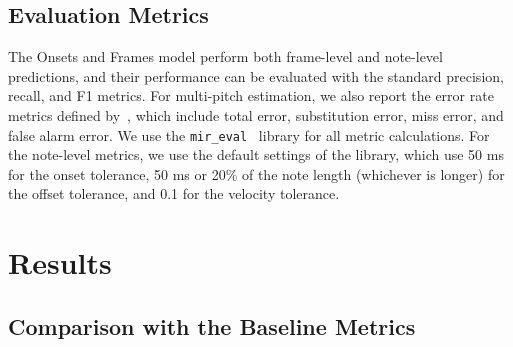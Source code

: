 \subsection{Evaluation Metrics}

The Onsets and Frames model perform both frame-level and note-level predictions, and their performance can be evaluated with the standard precision, recall, and F1 metrics.
For multi-pitch estimation, we also report the error rate metrics defined by~, which include total error, substitution error, miss error, and false alarm error.
We use the \texttt{mir\_eval}~\cite{raffel2014mir_eval} library for all metric calculations.
For the note-level metrics, we use the default settings of the library, which use 50 ms for the onset tolerance, 50 ms or 20\% of the note length (whichever is longer) for the offset tolerance, and 0.1 for the velocity tolerance.


\section{Results}



\subsection{Comparison with the Baseline Metrics}

